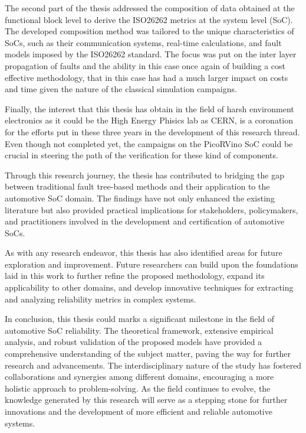\documentclass[./dissertation.tex]{subfiles}
\begin{document}
The second part of the thesis addressed the composition of data obtained at the functional block level to derive the ISO26262 metrics at the system level (SoC). The developed composition method was tailored to the unique characteristics of SoCs, such as their communication systems, real-time calculations, and fault models imposed by the ISO26262 standard. The focus was put on the inter layer propagation of faults and the ability in this case once again of building a cost effective methodology, that in this case has had a much larger impact on costs and time given the nature of the classical simulation campaigns.

Finally, the interest that this thesis has obtain in the field of harsh environment electronics as it could be the High Energy Phisics lab as CERN, is a coronation for the efforts put in these three years in the development of this research thread. Even though not completed yet, the campaigns on the PicoRVino SoC could be crucial in steering the path of the verification for these kind of components.

Through this research journey, the thesis has contributed to bridging the gap between traditional fault tree-based methods and their application to the automotive SoC domain. The findings have not only enhanced the existing literature but also provided practical implications for stakeholders, policymakers, and practitioners involved in the development and certification of automotive SoCs.

As with any research endeavor, this thesis has also identified areas for future exploration and improvement. Future researchers can build upon the foundations laid in this work to further refine the proposed methodology, expand its applicability to other domains, and develop innovative techniques for extracting and analyzing reliability metrics in complex systems.

In conclusion, this thesis could marks a significant milestone in the field of automotive SoC reliability. The theoretical framework, extensive empirical analysis, and robust validation of the proposed models have provided a comprehensive understanding of the subject matter, paving the way for further research and advancements. The interdisciplinary nature of the study has fostered collaborations and synergies among different domains, encouraging a more holistic approach to problem-solving. As the field continues to evolve, the knowledge generated by this research will serve as a stepping stone for further innovations and the development of more efficient and reliable automotive systems.

\end{document}
